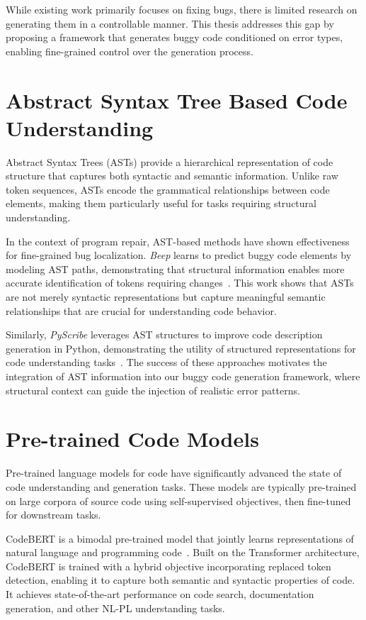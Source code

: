 While existing work primarily focuses on fixing bugs, there is limited research on generating them in a controllable manner. This thesis addresses this gap by proposing a framework that generates buggy code conditioned on error types, enabling fine-grained control over the generation process.

\section{Abstract Syntax Tree Based Code Understanding}

Abstract Syntax Trees (ASTs) provide a hierarchical representation of code structure that captures both syntactic and semantic information. Unlike raw token sequences, ASTs encode the grammatical relationships between code elements, making them particularly useful for tasks requiring structural understanding.

In the context of program repair, AST-based methods have shown effectiveness for fine-grained bug localization. \textit{Beep} learns to predict buggy code elements by modeling AST paths, demonstrating that structural information enables more accurate identification of tokens requiring changes~\cite{wang2021beepfinegrainedfixlocalization}. This work shows that ASTs are not merely syntactic representations but capture meaningful semantic relationships that are crucial for understanding code behavior.

Similarly, \textit{PyScribe} leverages AST structures to improve code description generation in Python, demonstrating the utility of structured representations for code understanding tasks~\cite{schuster2023pyscribe}. The success of these approaches motivates the integration of AST information into our buggy code generation framework, where structural context can guide the injection of realistic error patterns.

\section{Pre-trained Code Models}

Pre-trained language models for code have significantly advanced the state of code understanding and generation tasks. These models are typically pre-trained on large corpora of source code using self-supervised objectives, then fine-tuned for downstream tasks.

CodeBERT is a bimodal pre-trained model that jointly learns representations of natural language and programming code~\cite{feng2020codebertpretrainedmodelprogramming}. Built on the Transformer architecture, CodeBERT is trained with a hybrid objective incorporating replaced token detection, enabling it to capture both semantic and syntactic properties of code. It achieves state-of-the-art performance on code search, documentation generation, and other NL-PL understanding tasks.

